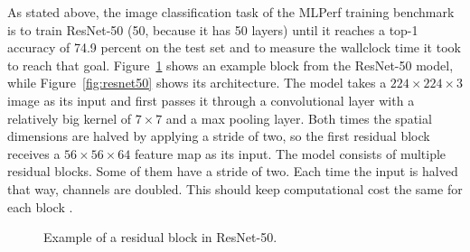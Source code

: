\documentclass[]{article}
\begin{document}
As stated above, the image classification task of the MLPerf
training benchmark is to train ResNet-50 (50, because it has 50
layers) until it reaches a top-1 accuracy of 74.9 percent on the test
set and to measure the wallclock time it took to reach that goal.
Figure~\ref{fig:resnet50_block} shows an example block from the
ResNet-50 model, while Figure~\ref{fig:resnet50} shows its
architecture.
The model takes a $224\times224\times3$ image as its input and first
passes it through a convolutional layer with a relatively big kernel
of $7\times7$ and a max pooling layer.
Both times the spatial dimensions are halved by applying a stride of
two, so the first residual block receives a $56 \times 56 \times 64$
feature map as its input.
The model consists of multiple residual blocks.
Some of them have a stride of two.
Each time the input is halved that way, channels are doubled.
This should keep computational cost the same for each block
\citep{he_et_al_2015}.

\begin{figure}
  \begin{center}
  \end{center}
  \caption{Example of a residual block in ResNet-50.}
  \label{fig:resnet50_block}
\end{figure}
\end{document}
